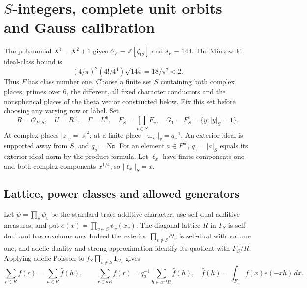 \documentclass[11pt,a4paper]{article}
\numberwithin{equation}{section}
\theoremstyle{definition}
\theoremstyle{remark}
\newcommand{\Z}{\mathbb Z}
\newcommand{\OO}{\mathcal O}
\newcommand{\N}{\mathrm N}
\newcommand{\ind}{\mathbf1}
\newcommand{\dd}{\,d}
\newcommand{\wt}{\widehat}
\begin{document}
\section{$S$-integers, complete unit orbits and Gauss calibration}\label{sec:arithmetic}
The polynomial $X^4-X^2+1$ gives $\OO_F=\Z[\zeta_{12}]$ and $d_F=144$. The Minkowski ideal-class bound is
\[
 (4/\pi)^2(4!/4^4)\sqrt{144}=18/\pi^2<2.
\]
Thus $F$ has class number one. Choose a finite set $S$ containing both complex places, primes over $6$, the different, all fixed character conductors and the nonspherical places of the theta vector constructed below. Fix this set before choosing any varying row or label. Set
\[
 R=\OO_{F,S},\quad U=R^\times,\quad \Gamma=U^6,\quad
 F_S=\prod_{v\in S}F_v,\quad G_1=F_S^1=\{y:|y|_S=1\}.
\]
At complex places $|z|_v=|z|^2$; at a finite place $|\varpi_v|_v=q_v^{-1}$. An exterior ideal is supported away from $S$, and $q_{\mathfrak a}=\N\mathfrak a$. For an element $a\in F^\times$, $q_a=|a|_S$ equals its exterior ideal norm by the product formula. Let $\ell_x$ have finite components one and both complex components $x^{1/4}$, so $|\ell_x|_S=x$.

\subsection{Lattice, power classes and allowed generators}
Let $\psi=\prod_v\psi_v$ be the standard trace additive character, use self-dual additive measures, and put $e(x)=\prod_{v\in S}\psi_v(x_v)$. The diagonal lattice $R$ in $F_S$ is self-dual and has covolume one. Indeed the exterior $\prod_{v\notin S}\OO_v$ is self-dual with volume one, and adelic duality and strong approximation identify its quotient with $F_S/R$. Applying adelic Poisson to $f_S\prod_{v\notin S}\ind_{\OO_v}$ gives
\begin{equation}\label{eq:lattice}
 \sum_{r\in R}f(r)=\sum_{h\in R}\wt f(h),\qquad
 \sum_{r\in aR}f(r)=q_a^{-1}\sum_{h\in a^{-1}R}\wt f(h),
 \quad \wt f(h)=\int_{F_S}f(x)e(-xh)\dd x.
\end{equation}
\end{document}
